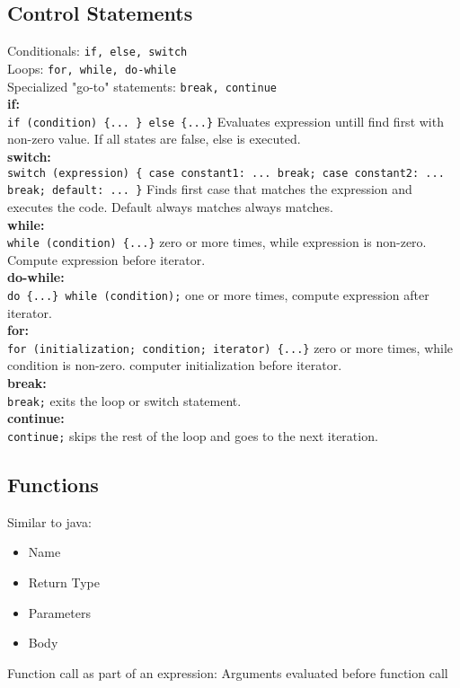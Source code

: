 \documentclass[answers,12pt,addpoints]{exam}
\begin{document}
\subsection{Control Statements}
Conditionals: \texttt{if, else, switch} \\
Loops: \texttt{for, while, do-while} \\
Specialized "go-to" statements: \texttt{break, continue} \\
\textbf{if:} \\
\texttt{if (condition) \{... \} else \{...\}}
Evaluates expression untill find first with non-zero value. If all states are false, else is executed. \\
\textbf{switch:} \\
\texttt{switch (expression) \{ case constant1: ... break; case constant2: ... break; default: ... \}} 
Finds first case that matches the expression and executes the code. Default always matches always matches. \\
\textbf{while:} \\
\texttt{while (condition) \{...\}} zero or more times, while expression is non-zero. Compute expression before iterator. \\
\textbf{do-while:} \\
\texttt{do \{...\} while (condition);} one or more times, compute expression after iterator. \\
\textbf{for:} \\
\texttt{for (initialization; condition; iterator) \{...\}} 
zero or more times, while condition is non-zero. computer initialization before iterator. \\
\textbf{break:} \\
\texttt{break;} exits the loop or switch statement. \\
\textbf{continue:} \\
\texttt{continue;} skips the rest of the loop and goes to the next iteration. 
\subsection{Functions}
Similar to java:
\begin{itemize}
    \item Name
    \item Return Type
    \item Parameters
    \item Body
\end{itemize}
Function call as part of an expression: Arguments evaluated before function call 
\end{document}
